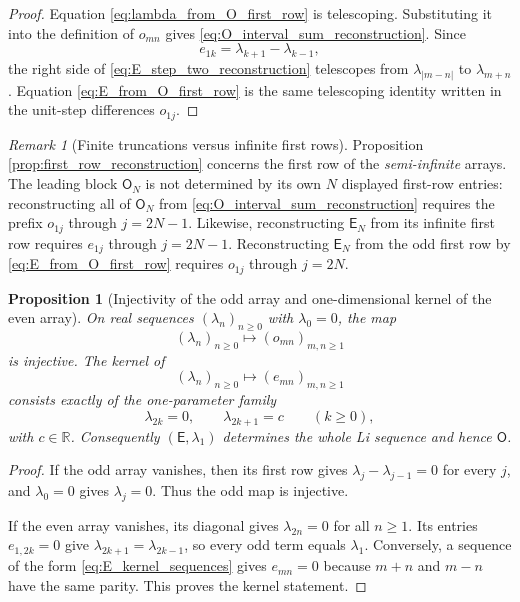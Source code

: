 \documentclass[11pt]{amsart}
\numberwithin{equation}{section}
\theoremstyle{plain}
\newtheorem{proposition}[theorem]{Proposition}
\theoremstyle{definition}
\theoremstyle{remark}
\newtheorem{remark}[theorem]{Remark}
\newcommand{\E}{\mathsf E}
\newcommand{\Omat}{\mathsf O}
\begin{document}
\begin{proof}
Equation \eqref{eq:lambda_from_O_first_row} is telescoping.  Substituting it into the definition of $o_{mn}$ gives \eqref{eq:O_interval_sum_reconstruction}.  Since
\begin{equation}
e_{1k}=\lambda_{k+1}-\lambda_{k-1},
\label{eq:E_first_row_step_two}
\end{equation}
the right side of \eqref{eq:E_step_two_reconstruction} telescopes from $\lambda_{|m-n|}$ to $\lambda_{m+n}$.  Equation \eqref{eq:E_from_O_first_row} is the same telescoping identity written in the unit-step differences $o_{1j}$.
\end{proof}

\begin{remark}[Finite truncations versus infinite first rows]
\label{rem:finite_first_row_warning}
Proposition \ref{prop:first_row_reconstruction} concerns the first row of the \emph{semi-infinite} arrays.  The leading block $\Omat_N$ is not determined by its own $N$ displayed first-row entries: reconstructing all of $\Omat_N$ from \eqref{eq:O_interval_sum_reconstruction} requires the prefix $o_{1j}$ through $j=2N-1$.  Likewise, reconstructing $\E_N$ from its infinite first row requires $e_{1j}$ through $j=2N-1$.  Reconstructing $\E_N$ from the odd first row by \eqref{eq:E_from_O_first_row} requires $o_{1j}$ through $j=2N$.
\end{remark}

\begin{proposition}[Injectivity of the odd array and one-dimensional kernel of the even array]
\label{prop:information_kernel}
On real sequences $(\lambda_n)_{n\ge0}$ with $\lambda_0=0$, the map
\begin{equation}
(\lambda_n)_{n\ge0}\longmapsto (o_{mn})_{m,n\ge1}
\label{eq:O_sequence_map}
\end{equation}
is injective.  The kernel of
\begin{equation}
(\lambda_n)_{n\ge0}\longmapsto (e_{mn})_{m,n\ge1}
\label{eq:E_sequence_map}
\end{equation}
consists exactly of the one-parameter family
\begin{equation}
\lambda_{2k}=0,
\qquad
\lambda_{2k+1}=c
\qquad(k\ge0),
\label{eq:E_kernel_sequences}
\end{equation}
with $c\in\mathbb R$.  Consequently $(\E,\lambda_1)$ determines the whole Li sequence and hence $\Omat$.
\end{proposition}

\begin{proof}
If the odd array vanishes, then its first row gives $\lambda_j-\lambda_{j-1}=0$ for every $j$, and $\lambda_0=0$ gives $\lambda_j=0$.  Thus the odd map is injective.

If the even array vanishes, its diagonal gives $\lambda_{2n}=0$ for all $n\ge1$.  Its entries $e_{1,2k}=0$ give $\lambda_{2k+1}=\lambda_{2k-1}$, so every odd term equals $\lambda_1$.  Conversely, a sequence of the form \eqref{eq:E_kernel_sequences} gives $e_{mn}=0$ because $m+n$ and $m-n$ have the same parity.  This proves the kernel statement.
\end{proof}
\end{document}
